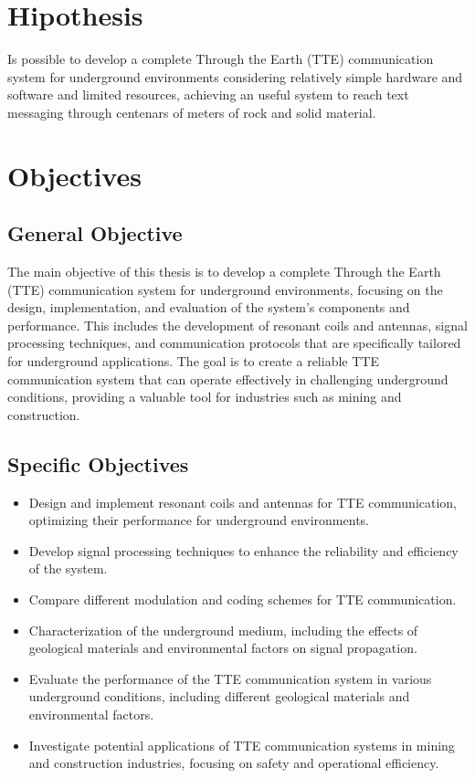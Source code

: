 \section{Hipothesis}
Is possible to develop a complete Through the Earth (TTE) communication system for underground environments considering relatively simple hardware and software and limited resources, achieving an useful system to reach text messaging through centenars of meters of rock and solid material.

\section{Objectives}
\subsection{General Objective}
The main objective of this thesis is to develop a complete Through the Earth (TTE) communication system for underground environments, focusing on the design, implementation, and evaluation of the system's components and performance. This includes the development of resonant coils and antennas, signal processing techniques, and communication protocols that are specifically tailored for underground applications. The goal is to create a reliable TTE communication system that can operate effectively in challenging underground conditions, providing a valuable tool for industries such as mining and construction.
\subsection{Specific Objectives}
    \begin{itemize}
    \item Design and implement resonant coils and antennas for TTE communication, optimizing their performance for underground environments.
    \item Develop signal processing techniques to enhance the reliability and efficiency of the system.
    \item Compare different modulation and coding schemes for TTE communication.
    \item Characterization of the underground medium, including the effects of geological materials and environmental factors on signal propagation.
    \item Evaluate the performance of the TTE communication system in various underground conditions, including different geological materials and environmental factors.
    \item Investigate potential applications of TTE communication systems in mining and construction industries, focusing on safety and operational efficiency.
    \end{itemize}
